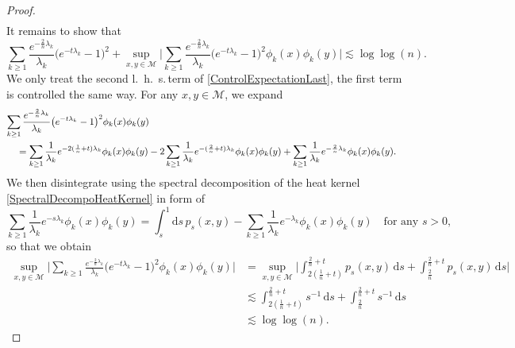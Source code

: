\documentclass[11pt,a4paper,oneside]{amsart}
\numberwithin{equation}{section}
\newcommand{\dd}{\mathrm{d}}
\newcommand{\lhs}{l.~h.~s.\,}
\begin{document}
\begin{proof}
\begin{align*}
%
\end{align*}
%
It remains to show that 
%
\begin{equation}\label{ControlExpectationLast}
%
\sum_{k\geq 1} \frac{e^{-\frac{2}{n}\lambda_k}}{\lambda_k}\big(e^{-t\lambda_k}-1\big)^2+\sup_{x,y\in\mathcal{M}}\bigg\vert\sum_{k\geq 1} \frac{e^{-\frac{2}{n}\lambda_k}}{\lambda_k}\big(e^{-t\lambda_k}-1\big)^2\phi_k(x)\phi_k(y)\bigg\vert\lesssim \log\log(n).
%
\end{equation}
%
We only treat the second \lhs term of \eqref{ControlExpectationLast}, the first term is controlled the same way. For any $x,y\in\mathcal{M}$, we expand
%
\begin{align*}
%
\lefteqn{\sum_{k\geq 1}\frac{e^{-\frac{2}{n}\lambda_k}}{\lambda_k}\big(e^{-t\lambda_k}-1\big)^2\phi_k(x)\phi_k(y)}\\ &\quad=\sum_{k\geq 1}\frac{1}{\lambda_k}e^{-2(\frac{1}{n}+t)\lambda_k}\phi_k(x)\phi_k(y)-2\sum_{k\geq 1}\frac{1}{\lambda_k}e^{-(\frac{2}{n}+t)\lambda_k}\phi_k(x)\phi_k(y)+\sum_{k\geq 1}\frac{1}{\lambda_k}e^{-\frac{2}{n}\lambda_k}\phi_k(x)\phi_k(y).
%
\end{align*}
%
We then disintegrate using the spectral decomposition of the heat kernel \eqref{SpectralDecompoHeatKernel} in form of  
%
$$\sum_{k\geq 1}\frac{1}{\lambda_k}e^{-s\lambda_k}\phi_k(x)\phi_k(y)=\int_{s}^1\dd s\, p_s(x,y)-\sum_{k\geq1}\frac{1}{\lambda_k}e^{-\lambda_k}\phi_k(x)\phi_k(y)\quad\text{for any $s>0$, }$$
%
so that we obtain
%
\begin{align*}
%
\sup_{x,y\in\mathcal{M}}\bigg\vert\sum_{k\geq 1}\frac{e^{-\frac{2}{n}\lambda_k}}{\lambda_k}\big(e^{-t\lambda_k}-1\big)^2\phi_k(x)\phi_k(y)\bigg\vert&=\sup_{x,y\in\mathcal{M}}\bigg\vert\int_{2(\frac{1}{n}+t)}^{\frac{2}{n}+t}p_s(x,y)\,\dd s+\int_{\frac{2}{n}}^{\frac{2}{n}+t}p_s(x,y)\,\dd s\bigg\vert\\
&\lesssim \int_{2(\frac{1}{n}+t)}^{\frac{2}{n}+t}s^{-1}\,\dd s+\int_{\frac{2}{n}}^{\frac{2}{n}+t}s^{-1}\,\dd s\\
&\lesssim \log\log(n).
%
\end{align*}

%
\medskip
%


\end{proof}
\end{document}
